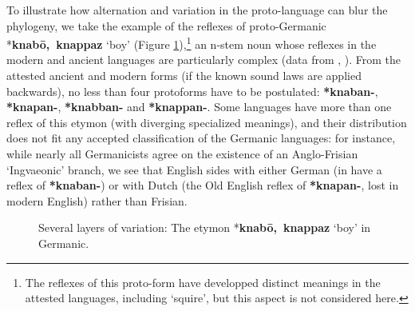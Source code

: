 \documentclass[svgnames,12pt]{scrartcl}
\newcommand{\ipa}[1]{\textbf{{\phon\mbox{#1}}}}
\begin{document}
{{To illustrate how alternation and variation in the proto-language can blur the phylogeny, we take the example of the reflexes of proto-Germanic *\ipa{knabō, knappaz} `boy' (Figure \ref{fig:knabe}),\footnote{The reflexes of this proto-form have developped distinct meanings in the attested languages, including `squire', but this aspect is not considered here.} an n-stem noun whose reflexes in the modern and ancient languages are particularly complex (data from \citealt[71,128]{kroonen11nstems}, \citealt[294]{kroonen13dict}).
From the attested ancient and modern forms (if the known sound laws are applied backwards), no less than four protoforms have to be postulated:  \ipa{*knaban-}, \ipa{*knapan-}, \ipa{*knabban-} and \ipa{*knappan-}. Some languages have more than one reflex of this etymon (with diverging specialized meanings), and their distribution does not fit any accepted classification of the Germanic languages: for instance, while nearly all Germanicists agree on the existence of an Anglo-Frisian `Ingvaeonic' branch, we see that English sides with either German (in have a reflex of \ipa{*knaban-}) or with Dutch (the Old English reflex of \ipa{*knapan-}, lost in modern English) rather than Frisian.

   \begin{figure}[h]
   \caption{Several layers of variation: The etymon *\ipa{knabō, knappaz} `boy' in Germanic.} \label{fig:knabe}   \centering
\end{figure}

}}
\end{document}
